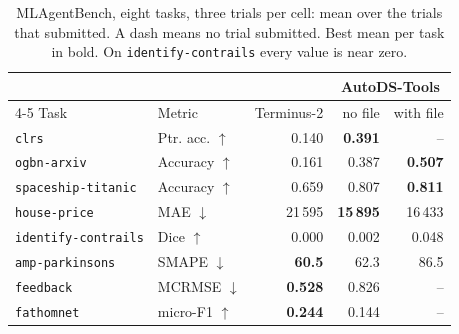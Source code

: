 \begin{table}[t]
\centering
\caption{MLAgentBench, eight tasks, three trials per cell: mean over the trials that submitted. A dash means no trial submitted. Best mean per task in bold. On \texttt{identify-contrails} every value is near zero.}
\label{tab:mlab}
\footnotesize
\setlength{\tabcolsep}{4pt}
\begin{tabular}{llrrr}
\toprule
 & & & \multicolumn{2}{c}{AutoDS-Tools} \\
\cmidrule(lr){4-5}
Task & Metric & Terminus-2 & no file & with file \\
\midrule
\texttt{clrs} & Ptr. acc. $\uparrow$ & 0.140 & \textbf{0.391} & -- \\
\texttt{ogbn-arxiv} & Accuracy $\uparrow$ & 0.161 & 0.387 & \textbf{0.507} \\
\texttt{spaceship-titanic} & Accuracy $\uparrow$ & 0.659 & 0.807 & \textbf{0.811} \\
\texttt{house-price} & MAE $\downarrow$ & 21\,595 & \textbf{15\,895} & 16\,433 \\
\texttt{identify-contrails} & Dice $\uparrow$ & 0.000 & 0.002 & 0.048 \\
\texttt{amp-parkinsons} & SMAPE $\downarrow$ & \textbf{60.5} & 62.3 & 86.5 \\
\texttt{feedback} & MCRMSE $\downarrow$ & \textbf{0.528} & 0.826 & -- \\
\texttt{fathomnet} & micro-F1 $\uparrow$ & \textbf{0.244} & 0.144 & -- \\
\bottomrule
\end{tabular}
\end{table}
